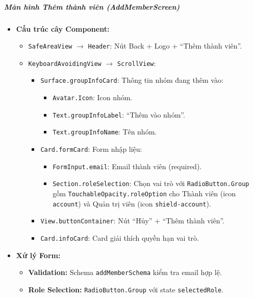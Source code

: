 \subparagraph{Màn hình Thêm thành viên (AddMemberScreen)}
\begin{itemize}
    \item \textbf{Cấu trúc cây Component:}
        \begin{itemize}
            \item \texttt{SafeAreaView} $\rightarrow$ \texttt{Header}: Nút Back + Logo + ``Thêm thành viên''.
            \item \texttt{KeyboardAvoidingView} $\rightarrow$ \texttt{ScrollView}:
                \begin{itemize}
                    \item \texttt{Surface.groupInfoCard}: Thông tin nhóm đang thêm vào:
                        \begin{itemize}
                            \item \texttt{Avatar.Icon}: Icon nhóm.
                            \item \texttt{Text.groupInfoLabel}: ``Thêm vào nhóm''.
                            \item \texttt{Text.groupInfoName}: Tên nhóm.
                        \end{itemize}
                    \item \texttt{Card.formCard}: Form nhập liệu:
                        \begin{itemize}
                            \item \texttt{FormInput.email}: Email thành viên (required).
                            \item \texttt{Section.roleSelection}: Chọn vai trò với \texttt{RadioButton.Group} gồm \texttt{TouchableOpacity.roleOption} cho Thành viên (icon \texttt{account}) và Quản trị viên (icon \texttt{shield-account}).
                        \end{itemize}
                    \item \texttt{View.buttonContainer}: Nút ``Hủy'' + ``Thêm thành viên''.
                    \item \texttt{Card.infoCard}: Card giải thích quyền hạn vai trò.
                \end{itemize}
        \end{itemize}
    \item \textbf{Xử lý Form:}
        \begin{itemize}
            \item \textbf{Validation:} Schema \texttt{addMemberSchema} kiểm tra email hợp lệ.
            \item \textbf{Role Selection:} \texttt{RadioButton.Group} với state \texttt{selectedRole}.

\end{itemize}
\end{itemize}
